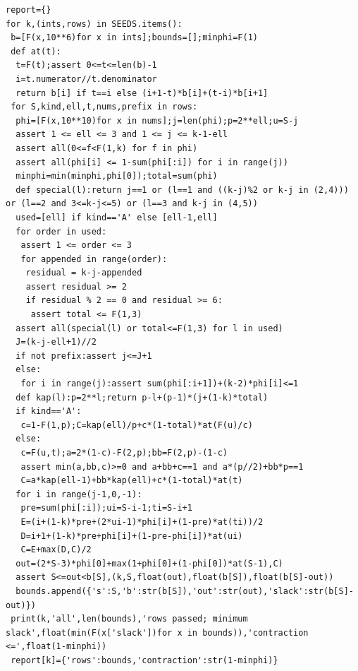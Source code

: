 \documentclass[11pt,reqno]{amsart}
\numberwithin{equation}{section}
\theoremstyle{definition}
\begin{document}
\begin{lstlisting}
report={}
for k,(ints,rows) in SEEDS.items():
 b=[F(x,10**6)for x in ints];bounds=[];minphi=F(1)
 def at(t):
  t=F(t);assert 0<=t<=len(b)-1
  i=t.numerator//t.denominator
  return b[i] if t==i else (i+1-t)*b[i]+(t-i)*b[i+1]
 for S,kind,ell,t,nums,prefix in rows:
  phi=[F(x,10**10)for x in nums];j=len(phi);p=2**ell;u=S-j
  assert 1 <= ell <= 3 and 1 <= j <= k-1-ell
  assert all(0<=f<F(1,k) for f in phi)
  assert all(phi[i] <= 1-sum(phi[:i]) for i in range(j))
  minphi=min(minphi,phi[0]);total=sum(phi)
  def special(l):return j==1 or (l==1 and ((k-j)%2 or k-j in (2,4))) or (l==2 and 3<=k-j<=5) or (l==3 and k-j in (4,5))
  used=[ell] if kind=='A' else [ell-1,ell]
  for order in used:
   assert 1 <= order <= 3
   for appended in range(order):
    residual = k-j-appended
    assert residual >= 2
    if residual % 2 == 0 and residual >= 6:
     assert total <= F(1,3)
  assert all(special(l) or total<=F(1,3) for l in used)
  J=(k-j-ell+1)//2
  if not prefix:assert j<=J+1
  else:
   for i in range(j):assert sum(phi[:i+1])+(k-2)*phi[i]<=1
  def kap(l):p=2**l;return p-l+(p-1)*(j+(1-k)*total)
  if kind=='A':
   c=1-F(1,p);C=kap(ell)/p+c*(1-total)*at(F(u)/c)
  else:
   c=F(u,t);a=2*(1-c)-F(2,p);bb=F(2,p)-(1-c)
   assert min(a,bb,c)>=0 and a+bb+c==1 and a*(p//2)+bb*p==1
   C=a*kap(ell-1)+bb*kap(ell)+c*(1-total)*at(t)
  for i in range(j-1,0,-1):
   pre=sum(phi[:i]);ui=S-i-1;ti=S-i+1
   E=(i+(1-k)*pre+(2*ui-1)*phi[i]+(1-pre)*at(ti))/2
   D=i+1+(1-k)*pre+phi[i]+(1-pre-phi[i])*at(ui)
   C=E+max(D,C)/2
  out=(2*S-3)*phi[0]+max(1+phi[0]+(1-phi[0])*at(S-1),C)
  assert S<=out<b[S],(k,S,float(out),float(b[S]),float(b[S]-out))
  bounds.append({'s':S,'b':str(b[S]),'out':str(out),'slack':str(b[S]-out)})
 print(k,'all',len(bounds),'rows passed; minimum slack',float(min(F(x['slack'])for x in bounds)),'contraction <=',float(1-minphi))
 report[k]={'rows':bounds,'contraction':str(1-minphi)}


\end{lstlisting}
\end{document}
